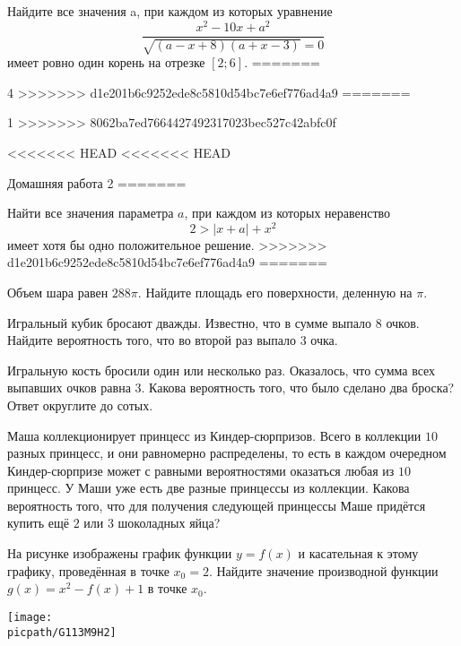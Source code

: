 \begin{class}[number=4]
\begin{listofex}
		\item Найдите все значения a, при каждом из которых уравнение
		\[\dfrac{ x^2-10x+a^2 }{ \sqrt{(a-x+8)(a+x-3)}=0 }\]
		имеет ровно один корень на отрезке \([2; 6]\).
=======
		\item 4
>>>>>>> d1e201b6c9252ede8c5810d54bc7e6ef776ad4a9
=======
		\item 1
>>>>>>> 8062ba7ed7664427492317023bec527c42abfc0f
	\end{listofex}
\end{class}

\begin{homework}[number=2]
	\begin{listofex}
<<<<<<< HEAD
<<<<<<< HEAD
		\item Домашняя работа 2
=======
		\item Найти все значения параметра \( a \), при каждом из которых неравенство
		\[ 2 > |x+a|+x^2 \]
		имеет хотя бы одно положительное решение.
>>>>>>> d1e201b6c9252ede8c5810d54bc7e6ef776ad4a9
=======
		\item Объем шара равен \( 288\pi \). Найдите площадь его поверхности, деленную на \( \pi \).
		\item Игральный кубик бросают дважды. Известно, что в сумме выпало \( 8 \) очков. Найдите вероятность того, что во второй раз выпало \( 3 \) очка.
		\item Игральную кость бросили один или несколько раз. Оказалось, что сумма всех выпавших очков равна \( 3 \). Какова вероятность того, что было сделано два броска? Ответ округлите до сотых.
		\item Маша коллекционирует принцесс из Киндер-сюрпризов. Всего в коллекции \( 10 \) разных принцесс, и они равномерно распределены, то есть в каждом очередном Киндер-сюрпризе может с равными вероятностями оказаться любая из \( 10 \) принцесс. У Маши уже есть две разные принцессы из коллекции. Какова вероятность того, что для получения следующей принцессы Маше придётся купить ещё \( 2 \) или \( 3 \) шоколадных яйца?
		\item 
		\begin{minipage}[t]{\bodywidth}
			На рисунке изображены график функции \( y=f(x) \) и касательная к этому графику, проведённая в точке \( x_0=2 \). Найдите значение производной функции \( g(x)=x^2-f(x)+1 \) в точке \( x_0 \).
		\end{minipage}
		\gapwidth
		\begin{minipage}[t]{\picwidth}
			\texttt{[image: \\picpath/G113M9H2]}

\end{minipage}
\end{listofex}
\end{homework}
